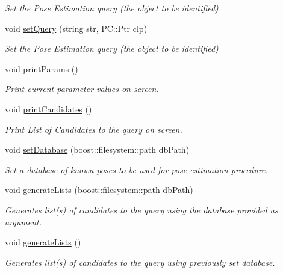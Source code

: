 \begin{DoxyCompactItemize}
\begin{DoxyCompactList}\small\item\em Set the Pose Estimation query (the object to be identified) \end{DoxyCompactList}\item 
void \hyperlink{classPoseEstimation_a0abb4e19ca862ef280f8d76ed2f9bac7}{set\-Query} (string str, P\-C\-::\-Ptr clp)
\begin{DoxyCompactList}\small\item\em Set the Pose Estimation query (the object to be identified) \end{DoxyCompactList}\item 
void \hyperlink{classPoseEstimation_a7f162e3e5383f895d7b6d1cd228ca076}{print\-Params} ()
\begin{DoxyCompactList}\small\item\em Print current parameter values on screen. \end{DoxyCompactList}\item 
void \hyperlink{classPoseEstimation_ac6fee319b5bc9464cc866aaaf99f6a5c}{print\-Candidates} ()
\begin{DoxyCompactList}\small\item\em Print List of Candidates to the query on screen. \end{DoxyCompactList}\item 
void \hyperlink{classPoseEstimation_a0ace84f98f2bab31e64ffaa4eefdf402}{set\-Database} (boost\-::filesystem\-::path db\-Path)
\begin{DoxyCompactList}\small\item\em Set a database of known poses to be used for pose estimation procedure. \end{DoxyCompactList}\item 
void \hyperlink{classPoseEstimation_a7f16094de53753e91efa3d4728a928be}{generate\-Lists} (boost\-::filesystem\-::path db\-Path)
\begin{DoxyCompactList}\small\item\em Generates list(s) of candidates to the query using the database provided as argument. \end{DoxyCompactList}\item 
void \hyperlink{classPoseEstimation_aa240b7ff2e362aa091f531ebd34359ad}{generate\-Lists} ()
\begin{DoxyCompactList}\small\item\em Generates list(s) of candidates to the query using previously set database. \end{DoxyCompactList}\end{DoxyCompactItemize}


